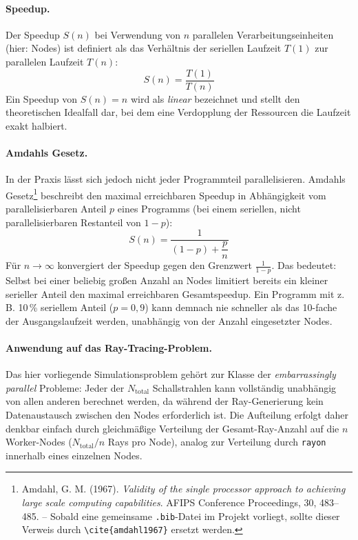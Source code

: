 \documentclass{article}
\begin{document}
\paragraph{Speedup.}
Der Speedup $S(n)$ bei Verwendung von $n$ parallelen Verarbeitungseinheiten
(hier: Nodes) ist definiert als das Verhältnis der seriellen Laufzeit
$T(1)$ zur parallelen Laufzeit $T(n)$:
\begin{equation}
 S(n) = \frac{T(1)}{T(n)}
 \label{eq:speedup}
\end{equation}
Ein Speedup von $S(n) = n$ wird als \emph{linear} bezeichnet und stellt
den theoretischen Idealfall dar, bei dem eine Verdopplung der Ressourcen
die Laufzeit exakt halbiert.

\paragraph{Amdahls Gesetz.}
In der Praxis lässt sich jedoch nicht jeder Programmteil parallelisieren.
Amdahls Gesetz\footnote{Amdahl, G. M. (1967). \emph{Validity of the
single processor approach to achieving large scale computing
capabilities}. AFIPS Conference Proceedings, 30, 483--485. --
Sobald eine gemeinsame \texttt{.bib}-Datei im Projekt vorliegt, sollte
dieser Verweis durch \texttt{\textbackslash cite\{amdahl1967\}}
ersetzt werden.} beschreibt den maximal erreichbaren
Speedup in Abhängigkeit vom parallelisierbaren Anteil $p$ eines Programms
(bei einem seriellen, nicht parallelisierbaren Restanteil von $1-p$):
\begin{equation}
 S(n) = \frac{1}{(1-p) + \dfrac{p}{n}}
 \label{eq:amdahl}
\end{equation}
Für $n \to \infty$ konvergiert der Speedup gegen den Grenzwert
$\frac{1}{1-p}$. Das bedeutet: Selbst bei einer beliebig großen Anzahl an
Nodes limitiert bereits ein kleiner serieller Anteil den maximal
erreichbaren Gesamtspeedup. Ein Programm mit z.\,B. 10\,\% seriellem
Anteil ($p = 0{,}9$) kann demnach nie schneller als das 10-fache der
Ausgangslaufzeit werden, unabhängig von der Anzahl eingesetzter Nodes.

\paragraph{Anwendung auf das Ray-Tracing-Problem.}
Das hier vorliegende Simulationsproblem gehört zur Klasse der
\emph{embarrassingly parallel} Probleme: Jeder der $N_{\text{total}}$
Schallstrahlen kann vollständig unabhängig von allen anderen berechnet
werden, da während der Ray-Generierung kein Datenaustausch zwischen den
Nodes erforderlich ist. Die Aufteilung erfolgt daher denkbar einfach durch
gleichmäßige Verteilung der Gesamt-Ray-Anzahl auf die $n$ Worker-Nodes
($N_{\text{total}} / n$ Rays pro Node), analog zur Verteilung durch
\texttt{rayon} innerhalb eines einzelnen Nodes.
\end{document}
